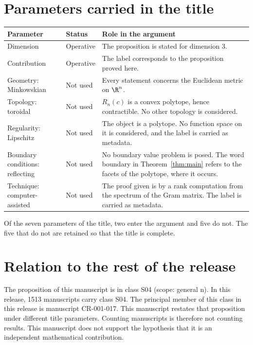 \documentclass[11pt]{article}
\begin{document}
\section{Parameters carried in the title}\label{sec:params}
\begin{center}
\small
\begin{tabular}{p{}p{}p{}}
\toprule
Parameter & Status & Role in the argument \\
\midrule
Dimension & Operative & The proposition is stated for dimension $3$. \\
Contribution & Operative & The label corresponds to the proposition proved here. \\
Geometry: Minkowskian & Not used & Every statement concerns the Euclidean metric on $\R^n$. \\
Topology: toroidal & Not used & $R_n(c)$ is a convex polytope, hence contractible. No other topology is considered. \\
Regularity: Lipschitz & Not used & The object is a polytope. No function space on it is considered, and the label is carried as metadata. \\
Boundary conditions: reflecting & Not used & No boundary value problem is posed. The word boundary in Theorem~\ref{thm:main} refers to the facets of the polytope, where it occurs. \\
Technique: computer-assisted & Not used & The proof given is by a rank computation from the spectrum of the Gram matrix. The label is carried as metadata. \\
\bottomrule
\end{tabular}
\end{center}
Of the seven parameters of the title, two enter the argument and five do not. The five that do not are retained so that the title is complete.

\section{Relation to the rest of the release}
The proposition of this manuscript is in class S04 (scope: general n).
In this release, 1513 manuscripts carry class S04. The principal member of this class in this release is manuscript CR-001-017. This manuscript restates that proposition under different title parameters.
Counting manuscripts is therefore not counting results. This manuscript does not support the hypothesis that it is an independent mathematical contribution.
\end{document}
